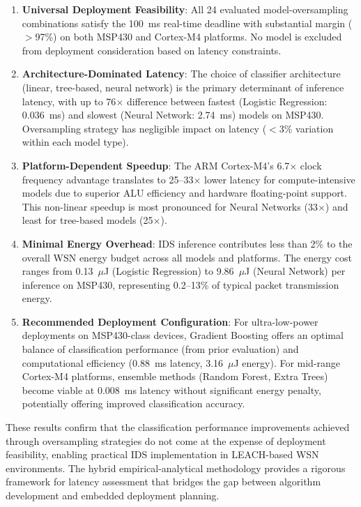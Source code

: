\begin{enumerate}
    \item \textbf{Universal Deployment Feasibility}: All 24 evaluated model-oversampling combinations satisfy the 100~ms real-time deadline with substantial margin ($>$97\%) on both MSP430 and Cortex-M4 platforms. No model is excluded from deployment consideration based on latency constraints.
    
    \item \textbf{Architecture-Dominated Latency}: The choice of classifier architecture (linear, tree-based, neural network) is the primary determinant of inference latency, with up to 76$\times$ difference between fastest (Logistic Regression: 0.036~ms) and slowest (Neural Network: 2.74~ms) models on MSP430. Oversampling strategy has negligible impact on latency ($<$3\% variation within each model type).
    
    \item \textbf{Platform-Dependent Speedup}: The ARM Cortex-M4's 6.7$\times$ clock frequency advantage translates to 25--33$\times$ lower latency for compute-intensive models due to superior ALU efficiency and hardware floating-point support. This non-linear speedup is most pronounced for Neural Networks (33$\times$) and least for tree-based models (25$\times$).
    
    \item \textbf{Minimal Energy Overhead}: IDS inference contributes less than 2\% to the overall WSN energy budget across all models and platforms. The energy cost ranges from 0.13~$\mu$J (Logistic Regression) to 9.86~$\mu$J (Neural Network) per inference on MSP430, representing 0.2--13\% of typical packet transmission energy.
    
    \item \textbf{Recommended Deployment Configuration}: For ultra-low-power deployments on MSP430-class devices, Gradient Boosting offers an optimal balance of classification performance (from prior evaluation) and computational efficiency (0.88~ms latency, 3.16~$\mu$J energy). For mid-range Cortex-M4 platforms, ensemble methods (Random Forest, Extra Trees) become viable at 0.008~ms latency without significant energy penalty, potentially offering improved classification accuracy.
\end{enumerate}

These results confirm that the classification performance improvements achieved through oversampling strategies do not come at the expense of deployment feasibility, enabling practical IDS implementation in LEACH-based WSN environments. The hybrid empirical-analytical methodology provides a rigorous framework for latency assessment that bridges the gap between algorithm development and embedded deployment planning.


